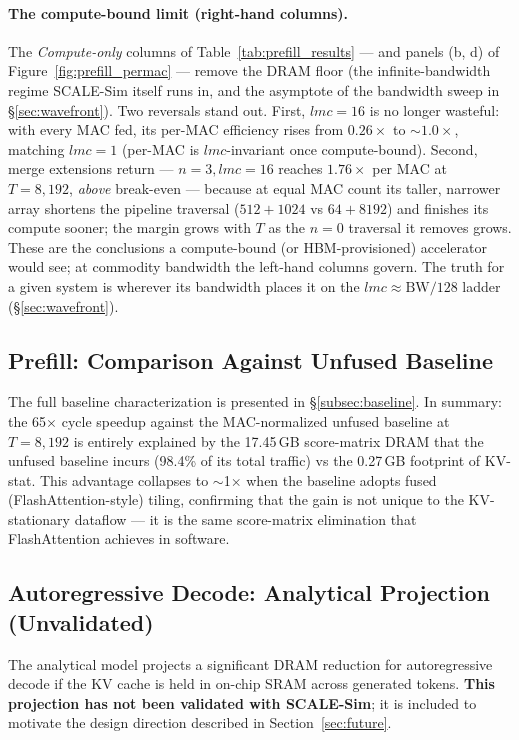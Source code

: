 \documentclass[11pt]{article}
\begin{document}
\paragraph{The compute-bound limit (right-hand columns).}
The \emph{Compute-only} columns of Table~\ref{tab:prefill_results} --- and panels
(b, d) of Figure~\ref{fig:prefill_permac} --- remove the DRAM floor (the
infinite-bandwidth regime SCALE-Sim itself runs in, and the asymptote of the
bandwidth sweep in \S\ref{sec:wavefront}). Two reversals stand out. First,
\(lmc = 16\) is no longer wasteful: with every MAC fed, its per-MAC efficiency rises
from \(0.26\times\) to \(\sim\!1.0\times\), matching \(lmc = 1\) (per-MAC is
\(lmc\)-invariant once compute-bound). Second, merge extensions return ---
\(n = 3, lmc = 16\) reaches \(\mathbf{1.76\times}\) per MAC at \(T = 8{,}192\),
\emph{above} break-even --- because at equal MAC count its taller, narrower array
shortens the pipeline traversal (\(512 + 1024\) vs \(64 + 8192\)) and finishes its
compute sooner; the margin grows with \(T\) as the \(n = 0\) traversal it removes
grows. These are the conclusions a compute-bound (or HBM-provisioned) accelerator
would see; at commodity bandwidth the left-hand columns govern. The truth for a
given system is wherever its bandwidth places it on the \(lmc \approx \text{BW}/128\)
ladder (\S\ref{sec:wavefront}).

\subsection{Prefill: Comparison Against Unfused Baseline}

The full baseline characterization is presented in
\S\ref{subsec:baseline}.
In summary: the 65$\times$ cycle speedup against the MAC-normalized
unfused baseline at \(T = 8{,}192\) is entirely explained by the
17.45\,GB score-matrix DRAM that the unfused baseline incurs
(98.4\% of its total traffic) vs the 0.27\,GB footprint of KV-stat.
This advantage collapses to \(\sim\)1$\times$ when the baseline
adopts fused (FlashAttention-style) tiling, confirming that the
gain is not unique to the KV-stationary dataflow --- it is the
same score-matrix elimination that FlashAttention achieves in
software.

\subsection{Autoregressive Decode: Analytical Projection (Unvalidated)}

The analytical model projects a significant DRAM reduction for
autoregressive decode if the KV cache is held in on-chip SRAM
across generated tokens.
\textbf{This projection has not been validated with SCALE-Sim};
it is included to motivate the design direction described in
Section~\ref{sec:future}.
\end{document}
